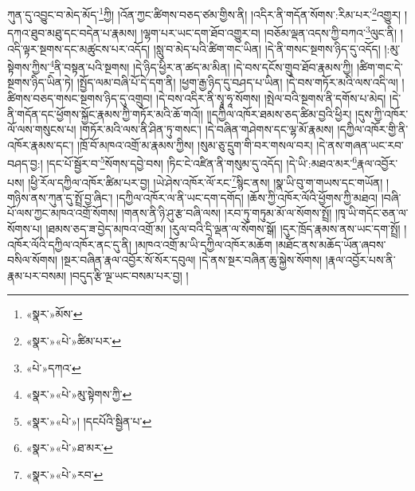 ཀུན་དུ་འབྱུང་བ་མེད་མོད་\footnote{«སྣར་»མོས་}ཀྱི། །འོན་ཀྱང་ཚིགས་བཅད་ཙམ་གྱིས་ནི། །འདིར་ནི་གདོན་སོགས་:རིམ་པར་\footnote{«སྣར་»«པེ་»ཚིམ་པར་}འགྱུར། །དཀའ་ཐུབ་མཐུ་དང་བདེན་པ་རྣམས། །ལྷག་པར་ཡང་དག་ཐོབ་འགྱུར་བ། །བཅོམ་ལྡན་འདས་ཀྱི་བཀའ་\footnote{«པེ་»དཀའ་}ལུང་ནི། །འདི་ལྟར་སྔགས་དང་མཚུངས་པར་འདོད། །སླུ་བ་མེད་པའི་ཚིག་གང་ཡིན། །དེ་ནི་གསང་སྔགས་ཉིད་དུ་འདོད། །:མུ་སྟེགས་ཀྱིས་\footnote{«སྣར་»«པེ་»མུ་སྟེགས་ཀྱི་}ནི་བསྟན་པའི་སྔགས། །དེ་ཉིད་ཕྱིར་ན་ཚད་མ་མིན། །དེ་བས་དངོས་གྲུབ་ཐོབ་རྣམས་ཀྱི། །ཚིག་གང་དེ་སྔགས་ཉིད་ཡིན་ཏེ། །སྤྱོད་ལམ་བཞི་པོ་དེ་དག་ནི། །ཕྱག་རྒྱ་ཉིད་དུ་བཤད་པ་ཡིན། །དེ་བས་གཏོར་མའི་ལས་འདི་ལ། །ཚིགས་བཅད་གསང་སྔགས་ཉིད་དུ་འགྲུབ། །དེ་བས་འདིར་ནི་སྭཱ་ཧཱ་སོགས། །སྤེལ་བའི་སྔགས་ནི་དགོས་པ་མེད། །དེ་ནི་གདོན་དང་ཕྱོགས་སྐྱོང་རྣམས་ཀྱི་གཏོར་མའི་ཆོ་གའོ།། །།དཀྱིལ་འཁོར་ཐམས་ཅད་ཚིམ་བྱའི་ཕྱིར། །དུས་ཀྱི་འཁོར་ལོ་ལས་གསུངས་པ། །གཏོར་མའི་ལས་ནི་ཤིན་ཏུ་གསང་། །དེ་བཞིན་གཤེགས་དང་ལྷ་མོ་རྣམས། །དཀྱིལ་འཁོར་གྱི་ནི་འཁོར་རྣམས་དང་། །ཁྲོ་བོ་མཁའ་འགྲོ་མ་རྣམས་ཀྱིས། །སུམ་ཅུ་དྲུག་གི་བར་གསལ་བར། །དེ་ནས་གཞན་ཡང་རབ་བཤད་བྱ:། །དང་པོ་སྦྱོར་བ་\footnote{«སྣར་»«པེ་»། །དངཔོའི་སྦྱིན་པ་}སོགས་དབྱེ་བས། །ཏིང་ངེ་འཛིན་ནི་གསུམ་དུ་འདོད། །དེ་ཡི་:མཐའ་མར་\footnote{«སྣར་»«པེ་»ཐ་མར་}རྣལ་འབྱོར་པས། །ཕྱི་རོལ་དཀྱིལ་འཁོར་ཚིམ་པར་བྱ། །ཡེ་ཤེས་འཁོར་ལོ་རང་\footnote{«སྣར་»«པེ་»རབ་}སྙིང་ནས། །སྣ་ཡི་བུ་ག་གཡས་དང་གཡོན། །གཉིས་ནས་ཀུན་དུ་སྤྲོ་བྱ་ཞིང་། །དཀྱིལ་འཁོར་ལ་ནི་ཡང་དག་དགོད། །ཆོས་ཀྱི་འཁོར་ལོའི་ཕྱོགས་ཀྱི་མཐའ། །བཞི་པོ་ལས་ཀྱང་མཁའ་འགྲོ་སོགས། །གནས་ནི་ཉི་ཤུ་རྩ་བཞི་ལས། །རབ་ཏུ་གཏུམ་མོ་ལ་སོགས་སྤྲོ། །ཁྭ་ཡི་གདོང་ཅན་ལ་སོགས་པ། །ཐམས་ཅད་ཟ་བྱེད་མཁའ་འགྲོ་མ། །རུལ་བའི་དྲི་ལྡན་ལ་སོགས་སྒོ། །དུར་ཁྲོད་རྣམས་ནས་ཡང་དག་སྤྲོ། །འཁོར་ལོའི་དཀྱིལ་འཁོར་ནང་དུ་ནི། །མཁའ་འགྲོ་མ་ཡི་དཀྱིལ་འཁོར་མཆོག །མཐོང་ནས་མཆོད་ཡོན་ཞབས་བསིལ་སོགས། །སྔར་བཞིན་རྣལ་འབྱོར་སོ་སོར་དབུལ། །དེ་ནས་སྔར་བཞིན་ཆུ་སྐྱེས་སོགས། །རྣལ་འབྱོར་པས་ནི་རྣམ་པར་བསམ། །བདུད་རྩི་ལྔ་ཡང་བསམ་པར་བྱ། །
